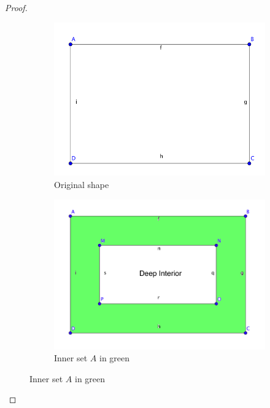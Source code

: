 \begin{proof}
\begin{figure}[!htb]
\centering
\begin{subfigure}[b]{.4\linewidth}
\includegraphics[width=\linewidth]{original_shape}
\caption{Original shape}\label{fig:mouse}
\end{subfigure}\hspace{20 mm}
\begin{subfigure}[b]{.4\linewidth}
\includegraphics[width=\linewidth]{inner_boundary}
\caption{Inner set $A$ in green}\label{fig:gull}
\end{subfigure}


\end{figure}
\end{proof}
